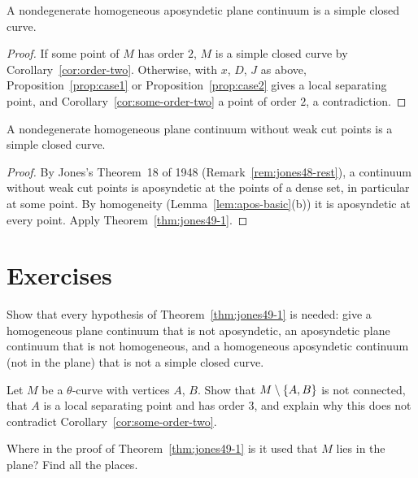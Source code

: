 \begin{theorem}\label{thm:jones49-1}
A nondegenerate homogeneous aposyndetic plane continuum is a simple closed curve.
\end{theorem}

\begin{proof}
If some point of $M$ has order $2$, $M$ is a simple closed curve by Corollary~\ref{cor:order-two}. Otherwise, with $x$, $D$, $J$ as above, Proposition~\ref{prop:case1} or
Proposition~\ref{prop:case2} gives a local separating point, and Corollary~\ref{cor:some-order-two} a point of order $2$, a contradiction.
\end{proof}


\begin{corollary}\label{cor:jones49-2}
A nondegenerate homogeneous plane continuum without weak cut points is a simple closed curve.
\end{corollary}

\begin{proof}
By Jones's Theorem~18 of 1948 (Remark~\ref{rem:jones48-rest}), a continuum without weak cut points is aposyndetic at the points of a dense set, in particular at some point.
By homogeneity (Lemma~\ref{lem:apos-basic}(b)) it is aposyndetic at every point. Apply Theorem~\ref{thm:jones49-1}.
\end{proof}


\section*{Exercises}

\begin{exercise}
Show that every hypothesis of Theorem~\ref{thm:jones49-1} is needed: give a homogeneous plane continuum that is not aposyndetic, an aposyndetic plane continuum that is not
homogeneous, and a homogeneous aposyndetic continuum (not in the plane) that is not a simple closed curve.
\end{exercise}

\begin{exercise}
Let $M$ be a $\theta$-curve with vertices $A$, $B$. Show that $M\setminus\left\{ A,B \right\}$ is not connected, that $A$ is a local separating point and has order $3$,
and explain why this does not contradict Corollary~\ref{cor:some-order-two}.
\end{exercise}

\begin{exercise}
Where in the proof of Theorem~\ref{thm:jones49-1} is it used that $M$ lies in the plane? Find all the places.
\end{exercise}
